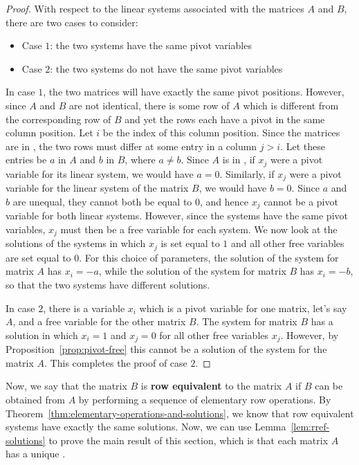 \begin{proof}
  With respect to the linear systems associated with the matrices $A$ and $B$, there are two cases to consider:
  \begin{itemize}
  \item Case $1$: the two systems have the same pivot variables
  \item Case $2$: the two systems do not have the same pivot variables
  \end{itemize}
  In case $1$, the two matrices will have exactly the same pivot
  positions. However, since $A$ and $B$ are not identical, there is
  some row of $A$ which is different from the corresponding row of $B$
  and yet the rows each have a pivot in the same column position. Let
  $i$ be the index of this column position. Since the matrices are in
  {\rref}, the two rows must differ at some entry in a column
  $j>i$. Let these entries be $a$ in $A$ and $b$ in $B$, where
  $a \neq b$. Since $A$ is in {\rref}, if $x_j$ were a pivot variable
  for its linear system, we would have $a=0$. Similarly, if $x_j$ were
  a pivot variable for the linear system of the matrix $B$, we would
  have $b=0$. Since $a$ and $b$ are unequal, they cannot both be equal
  to $0$, and hence $x_j$ cannot be a pivot variable for both linear
  systems. However, since the systems have the same pivot variables,
  $x_j$ must then be a free variable for each system. We now look at
  the solutions of the systems in which $x_j$ is set equal to $1$ and
  all other free variables are set equal to $0$. For this choice of
  parameters, the solution of the system for matrix $A$ has $x_i=-a$,
  while the solution of the system for matrix $B$ has $x_i=-b$, so
  that the two systems have different solutions.

  In case $2$, there is a variable $x_i$ which is a pivot variable for
  one matrix, let's say $A$, and a free variable for the other matrix
  $B$. The system for matrix $B$ has a solution in which $x_i=1$ and
  $x_j=0$ for all other free variables $x_j$. However, by
  Proposition~\ref{prop:pivot-free} this cannot be a solution of the
  system for the matrix $A$. This completes the proof of case $2$.
\end{proof}

Now, we say that the matrix $B$ is \textbf{row equivalent}%
%
%
to the matrix $A$ if $B$ can be obtained from
$A$ by performing a sequence of elementary row operations. By
Theorem~\ref{thm:elementary-operations-and-solutions}, we know that row
equivalent systems have exactly the same solutions. Now, we can use
Lemma~\ref{lem:rref-solutions} to prove the main result of this
section, which is that each matrix $A$ has a unique {\rref}.

